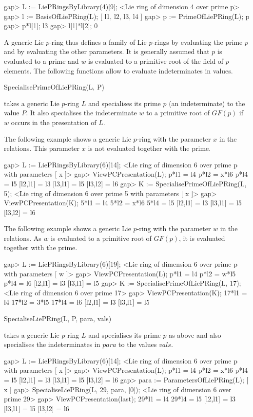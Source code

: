\beginexample
gap> L := LiePRingsByLibrary(4)[9];
<Lie ring of dimension 4 over prime p>
gap> l := BasisOfLiePRing(L);
[ l1, l2, l3, l4 ]
gap> p := PrimeOfLiePRing(L);
p
gap> p*l[1];
l3
gap> l[1]*l[2];
0
\endexample

A generic Lie $p$-ring thus defines a family of Lie $p$-rings by evaluating
the prime $p$ and by evaluating the other parameters. It is generally 
assumed that $p$ is evaluated to a prime and $w$ is evaluated to a primitive
root of the field of $p$ elements. The following functions allow to evaluate 
indeterminates in values.

\> SpecialisePrimeOfLiePRing(L, P)

takes a generic Lie $p$-ring $L$ and specialises its prime $p$ (an 
indeterminate) to the value $P$. It also specialises the indeterminate
$w$ to a primitive root of $GF(p)$ if $w$ occurs in the presentation 
of $L$. 

The following example shows a generic Lie $p$-ring with the parameter
$x$ in the relations. This parameter $x$ is not evaluated together with
the prime.

\beginexample
gap> L := LiePRingsByLibrary(6)[14];
<Lie ring of dimension 6 over prime p with parameters [ x ]>
gap> ViewPCPresentation(L);
p*l1 = l4
p*l2 = x*l6
p*l4 = l5
[l2,l1] = l3
[l3,l1] = l5
[l3,l2] = l6
gap> K := SpecialisePrimeOfLiePRing(L, 5);
<Lie ring of dimension 6 over prime 5 with parameters [ x ]>
gap> ViewPCPresentation(K);
5*l1 = l4
5*l2 = x*l6
5*l4 = l5
[l2,l1] = l3
[l3,l1] = l5
[l3,l2] = l6
\endexample

The following example shows a generic Lie $p$-ring with the parameter
$w$ in the relations. As $w$ is evaluated to a primitive root of $GF(p)$,
it is evaluated together with the prime.

\beginexample
gap> L := LiePRingsByLibrary(6)[19];
<Lie ring of dimension 6 over prime p with parameters [ w ]>
gap> ViewPCPresentation(L);
p*l1 = l4
p*l2 = w*l5
p*l4 = l6
[l2,l1] = l3
[l3,l1] = l5
gap> K := SpecialisePrimeOfLiePRing(L, 17);
<Lie ring of dimension 6 over prime 17>
gap> ViewPCPresentation(K);
17*l1 = l4
17*l2 = 3*l5
17*l4 = l6
[l2,l1] = l3
[l3,l1] = l5
\endexample

\> SpecialiseLiePRing(L, P, para, vals)

takes a generic Lie $p$-ring $L$ and specialises its prime $p$ as above
and also specialises the indeterminates in $para$ to the values $vals$.

\beginexample
gap> L := LiePRingsByLibrary(6)[14];
<Lie ring of dimension 6 over prime p with parameters [ x ]>
gap> ViewPCPresentation(L);
p*l1 = l4
p*l2 = x*l6
p*l4 = l5
[l2,l1] = l3
[l3,l1] = l5
[l3,l2] = l6
gap> para := ParametersOfLiePRing(L);
[ x ]
gap> SpecialiseLiePRing(L, 29, para, [0]);
<Lie ring of dimension 6 over prime 29>
gap> ViewPCPresentation(last);
29*l1 = l4
29*l4 = l5
[l2,l1] = l3
[l3,l1] = l5
[l3,l2] = l6
\endexample

